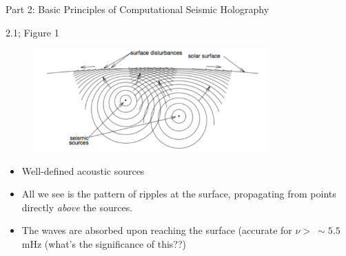 \documentclass{beamer}
\begin{document}
\begin{frame}{Part 2: Basic Principles of Computational Seismic
Holography}
\end{frame}

\begin{frame}{2.1; Figure 1}
    \begin{figure}
        \includegraphics[width=0.8\textwidth]{fig_1.pdf}
    \end{figure}
    \begin{itemize}
        \item Well-defined acoustic sources
        \item All we see is the pattern of ripples at the surface,
            propagating from points directly \emph{above} the sources.
        \item The waves are absorbed upon reaching the surface
            (accurate for $\nu >\ \sim 5.5$ mHz (what's the significance of
            this??)
    \end{itemize}
\end{frame}
\end{document}
